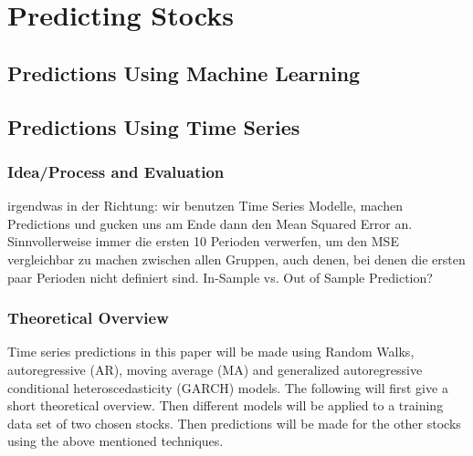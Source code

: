 \chapter{Predicting Stocks}\label{ch:predictions}


\section{Predictions Using Machine Learning}

\section{Predictions Using Time Series}
\subsection{Idea/Process and Evaluation}
irgendwas in der Richtung: wir benutzen Time Series Modelle, machen Predictions und gucken uns am Ende dann den Mean Squared Error an. Sinnvollerweise immer die ersten 10 Perioden verwerfen, um den MSE vergleichbar zu machen zwischen allen Gruppen, auch denen, bei denen die ersten paar Perioden nicht definiert sind. 	
In-Sample vs. Out of Sample Prediction?


\subsection{Theoretical Overview}
Time series predictions in this paper will be made using Random Walks, autoregressive (AR), moving average (MA) and generalized autoregressive conditional heteroscedasticity (GARCH) models. The following will first give a short theoretical overview. Then different models will be applied to a training data set of two chosen stocks. Then predictions will be made for the other stocks using the above mentioned techniques. 

